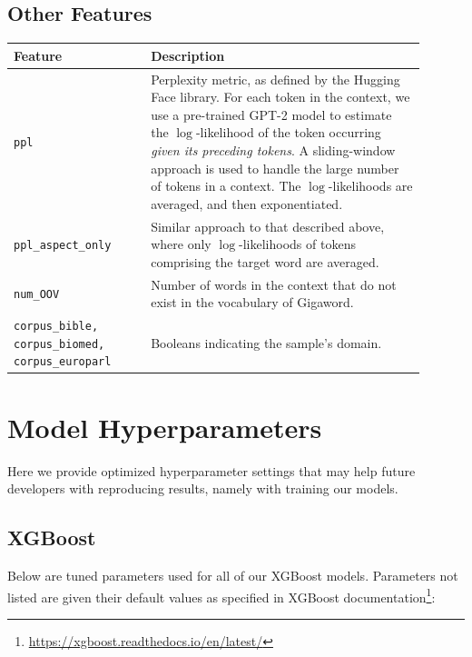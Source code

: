 \documentclass{dcthesis}
\theoremstyle{definition}
\theoremstyle{remark}
\begin{document}
\section{Other Features}

\begin{table}[H]
  \centering
  \begin{tabular}{>{\centering\arraybackslash}p{0.3\linewidth}>{\arraybackslash}p{0.6\linewidth}}
    \textbf{Feature} & \textbf{Description} \\ \hline 
    \texttt{ppl} & Perplexity metric, as defined by the Hugging Face library.\tablefootnote{\url{https://huggingface.co/transformers/perplexity.html}} For each token in the context, we use a pre-trained GPT-2 model to estimate the $\log$-likelihood of the token occurring \textit{given its preceding tokens}. A sliding-window approach is used to handle the large number of tokens in a context. The $\log$-likelihoods are averaged, and then exponentiated.\\
    \hline 
    \texttt{ppl\_aspect\_only} & Similar approach to that described above, where only $\log$-likelihoods of tokens comprising the target word are averaged.\\
    \hline 
    \texttt{num\_OOV} & Number of words in the context that do not exist in the vocabulary of Gigaword.\\
    \hline 
    \texttt{corpus\_bible, corpus\_biomed, corpus\_europarl} & Booleans indicating the sample's domain.\\
  \end{tabular}
  \label{other_features}
\end{table}

\chapter{Model Hyperparameters}
\label{appendix:hyperparameters}

Here we provide optimized hyperparameter settings that may help future developers with reproducing results, namely with training our models.

\section{XGBoost}

Below are tuned parameters used for all of our XGBoost models. Parameters not listed are given their default values as specified in XGBoost documentation\footnote{\url{https://xgboost.readthedocs.io/en/latest/}}:
\end{document}
